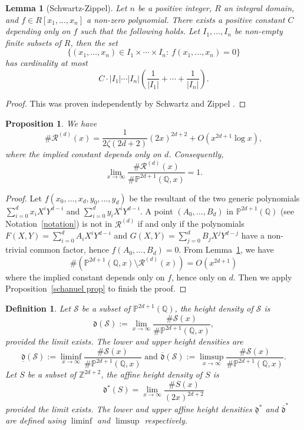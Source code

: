 \documentclass[12pt]{amsart}
\newtheorem{lemma}[theorem]{Lemma}
\newtheorem{definition}[theorem]{Definition}
\newtheorem{proposition}[theorem]{Proposition}
\newcommand{\Z}{\mathbb{Z}}
\newcommand{\Q}{\mathbb{Q}}
\newcommand{\cR}{\mathcal{R}}
\newcommand{\cS}{\mathcal{S}}
\numberwithin{equation}{section}
\begin{document}
\begin{lemma}[Schwartz-Zippel]\label{Schzipp lemma}
    Let $n$ be a positive integer, $R$ an integral domain, and $f\in R[x_1, \dots, x_n]$ a non-zero polynomial. There exists a positive constant $C$ depending only on $f$ such that the following holds. Let $I_1,\ldots,I_n$ be non-empty finite subsets of $R$, then the set
    $$\{(x_1,\ldots,x_n)\in I_1\times\cdots\times I_n:\ f(x_1,\ldots,x_n)=0\}$$
    has cardinality at most
    $$C\cdot |I_1|\cdots |I_n|\left(\frac{1}{|I_1|}+\cdots+\frac{1}{|I_n|}\right).$$
\end{lemma}
\begin{proof}
    This was proven independently by Schwartz \cite{Schwartz} and Zippel \cite{Zippel}.
\end{proof}



\begin{proposition}\label{count for Rd}
   We have 
    \[\# \cR^{(d)}(x)= \frac{1}{2\zeta(2d+2)}(2x)^{2d+2}+O\left( x^{2d+1}\log x\right),\] where the implied constant depends only on $d$.
    Consequently,
    \[\lim_{x\rightarrow\infty} \frac{\# \cR^{(d)}(x)}{\# \mathbb{P}^{2d+1}(\Q, x)}=1.\]
\end{proposition}
\begin{proof}
    Let $f(x_0,\ldots,x_d,y_0,\ldots,y_d)$ be the resultant of the two generic polynomials $\displaystyle \sum_{i=0}^d x_i X^i Y^{d-i} $ and
    $\displaystyle \sum_{i=0}^d y_i X^i Y^{d-i}$. 
    A point $(A_0, \dots, B_d)$ in $\mathbb{P}^{2d+1}(\Q)$ (see Notation~\ref{notation}) is not in $\cR^{(d)}$ if and only if
    the polynomials $ F(X, Y) = \sum_{i=0}^d A_i X^i Y^{d-i} $ and $ G(X, Y) = \sum_{j=0}^d B_j X^j Y^{d-j} $ have a non-trivial common factor, hence
    $f(A_0,\ldots,B_d)=0$. From Lemma~\ref{Schzipp lemma}, we have
    $$\#(\mathbb{P}^{2d+1}(\Q,x)\setminus \cR^{(d)}(x))=O(x^{2d+1})$$
    where the implied constant depends only on $f$, hence only on $d$. Then we apply
    Proposition~\ref{schanuel prop} to finish the proof.
\end{proof}


\begin{definition}Let $\cS$ be a subset of $\mathbb{P}^{2d+1}(\Q)$, the \emph{height density} of $\cS$ is 
\[\mathfrak{d}(\cS):=\lim_{x\rightarrow \infty} \frac{\# \cS(x)}{\# \mathbb{P}^{2d+1}(\Q,x)},\] provided the limit exists. The lower and upper height densities are 
\[\underline{\mathfrak{d}}(\cS):=\liminf_{x\rightarrow \infty} \frac{\# \cS(x)}{\# \mathbb{P}^{2d+1}(\Q,x)}\text{ and }\overline{\mathfrak{d}}(\cS):=\limsup_{x\rightarrow \infty} \frac{\# \cS(x)}{\# \mathbb{P}^{2d+1}(\Q,x)}.\]
Let $S$ be a subset of $\Z^{2d+2}$, the affine height density of $S$ is
$$\mathfrak{d}^*(S)=\lim_{x\rightarrow \infty} \frac{\# S(x)}{(2x)^{2d+2}}$$
provided the limit exists. The lower and upper affine height densities $\underline{\mathfrak{d}}^*$ and $\overline{\mathfrak{d}}^*$
are defined using $\liminf$ and $\limsup$ respectively.
\end{definition}
\end{document}
